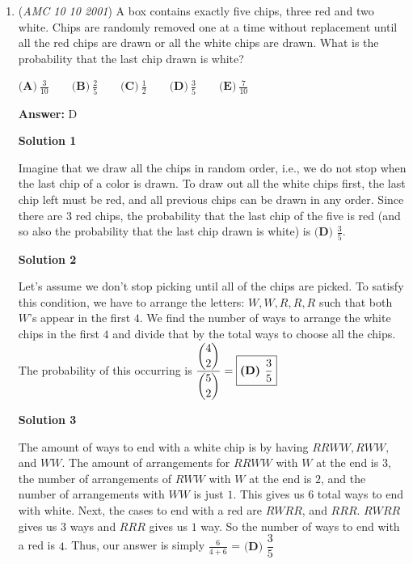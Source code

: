 \begin{enumerate}
 -OofPirate

 



\textbf{Solution 5}

Using the middle row and middle column, we can get $18+x+y=24+x+z$, so $y-z=6$. Then, by using the choices, $y+z=43, 44, 45, 46,$ or $47$. After solving for $y$ and $z$, we can fill up the square to see that the only possibility is $\boxed{\textbf{(D)}\ 46}$.

 -DaBob

 


	\item (\textit{AMC 10 10 2001}) A box contains exactly five chips, three red and two white. Chips are randomly removed one at a time without replacement until all the red chips are drawn or all the white chips are drawn. What is the probability that the last chip drawn is white?


 $\textbf{(A)}\ \frac{3}{10}\qquad\textbf{(B)}\ \frac{2}{5}\qquad\textbf{(C)}\ \frac{1}{2}\qquad\textbf{(D)}\ \frac{3}{5}\qquad\textbf{(E)}\ \frac{7}{10}$

 \textbf{Answer: }D



\textbf{Solution 1}

Imagine that we draw all the chips in random order, i.e., we do not stop when the last chip of a color is drawn. To draw out all the white chips first, the last chip left must be red, and all previous chips can be drawn in any order. Since there are $3$ red chips, the probability that the last chip of the five is red (and so also the probability that the last chip drawn is white) is $\boxed{\textbf{(D) } \frac {3}{5}}$.

 



\textbf{Solution 2}

Let's assume we don't stop picking until all of the chips are picked. To satisfy this condition, we have to arrange the letters: $W, W, R, R, R$ such that both $W$'s appear in the first $4$. We find the number of ways to arrange the white chips in the first $4$ and divide that by the total ways to choose all the chips. The probability of this occurring is $\dfrac{\dbinom{4}{2}}{\dbinom{5}{2}} = \boxed{\textbf{(D) }\dfrac35}$




\textbf{Solution 3}

The amount of ways to end with a white chip is by having $RRWW, RWW,$ and $WW$. The amount of arrangements for $RRWW$ with $W$ at the end is $3$, the number of arrangements of $RWW$ with $W$ at the end is $2$, and the number of arrangements with $WW$ is just $1$. This gives us $6$ total ways to end with white. Next, the cases to end with a red are $RWRR$, and $RRR$. $RWRR$ gives us $3$ ways and $RRR$ gives us $1$ way. So the number of ways to end with a red is $4$. Thus, our answer is simply $\frac{6}{4+6}$ = $\boxed{\textbf{(D) }\dfrac35}$





\end{enumerate}
